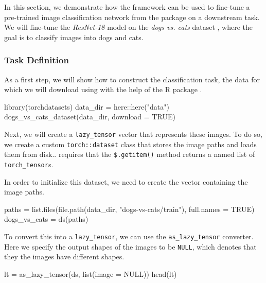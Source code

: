 \documentclass[article, nojss]{jss}
\theoremstyle{definition}
\begin{document}
In this section, we demonstrate how the  framework can be used to fine-tune a pre-trained image classification network from the  package on a downstream task.
We will fine-tune the \emph{ResNet-18} model \citep{he2015deepresiduallearningimage} on the \emph{dogs vs. cats} dataset \citep{dogs-vs-cats}, where the goal is to classify images into dogs and cats.

\subsubsection{Task Definition}

As a first step, we will show how to construct the classification task, the data for which we will download using with the help of the  R package \citep{torchdatasets}.

\begin{CodeInput}
library(torchdatasets)
data_dir = here::here("data")
dogs_vs_cats_dataset(data_dir, download = TRUE)
\end{CodeInput}

Next, we will create a \texttt{lazy\_tensor} vector that represents these images.
To do so, we create a custom \texttt{torch::dataset} class that stores the image paths and loads them from disk..
 requires that the \texttt{\$.getitem()} method returns a named list of \texttt{torch\_tensor}s.


In order to initialize this dataset, we need to create the vector containing the image paths.

\begin{CodeInput}
paths = list.files(file.path(data_dir, "dogs-vs-cats/train"), full.names = TRUE)
dogs_vs_cats = ds(paths)
\end{CodeInput}

To convert this into a \texttt{lazy\_tensor}, we can use the \texttt{as\_lazy\_tensor} converter.
Here we specify the output shapes of the images to be \texttt{NULL}, which denotes that they the images have different shapes.

\begin{CodeInput}
lt = as_lazy_tensor(ds, list(image = NULL))
head(lt)
\end{CodeInput}
\end{document}
